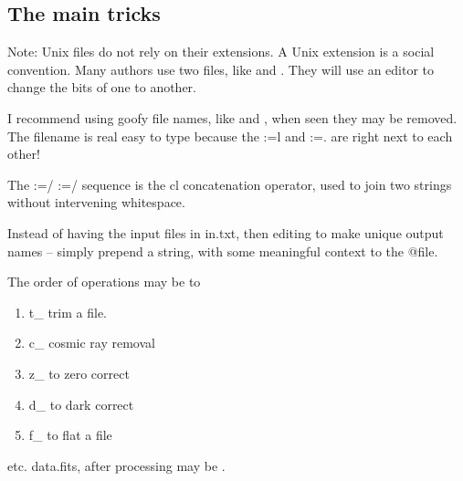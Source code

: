 \documentclass[letter,11pt,oneside]{article}
\makeatletter
\newcommand\llbox[1]{%
  \@tfor\@ii:=#1\do{%
    {\color{verbcolor}\Ovalbox{\strut\@ii}}%
  }%
}
\newcommand{\dhl}[1]{{\color{verbcolor}{\texttt#1}}}
\makeatother
\begin{document}
\clearpage
\subsection{The main tricks}

Note: Unix files do not rely on their extensions. A Unix extension is a social
convention. Many authors use two files, like \dhl{in.txt} and \dhl{out.txt}.
They will use an editor to change the bits of one to another. 

I recommend using goofy file names, like \dhl{xxx} and \dhl{l.l}, when seen
they may be removed. The filename \dhl{l.l} is real easy to type because
the \llbox{l} and \llbox{.} are right next to each other!

The \llbox{/}\llbox{/} sequence is the cl concatenation operator, used to
join two strings without intervening whitespace.

Instead of having the input files in in.txt, then editing to make unique
output names -- simply prepend a string, with some meaningful context
to the @file. 

The order of operations may be to
\vspace{-.15cm}
\begin{enumerate}\addtolength{\itemsep}{-0.5\baselineskip}
   \item   t\_ trim a file.
   \item   c\_ cosmic ray removal
   \item   z\_ to zero correct
   \item   d\_ to dark correct
   \item   f\_ to flat a file
\end{enumerate}


etc. data.fits, after processing may be \dhl{f\_d\_z\_c\_t\_data.fits}.
\end{document}
